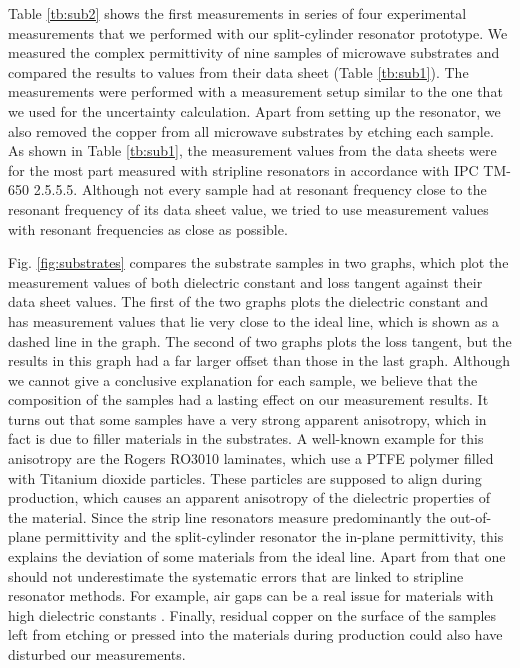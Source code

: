 Table \ref{tb:sub2} shows the first measurements in series of four experimental measurements that we performed with our split-cylinder resonator prototype. We measured the complex permittivity of nine samples of microwave substrates and compared the results to values from their data sheet (Table \ref{tb:sub1}). The measurements were performed with a measurement setup similar to the one that we used for the uncertainty calculation. Apart from setting up the resonator, we also removed the copper from all microwave substrates by etching each sample. As shown in Table \ref{tb:sub1}, the measurement values from the data sheets were for the most part measured with stripline resonators in accordance with IPC TM-650 2.5.5.5. Although not every sample had at resonant frequency close to the resonant frequency of its data sheet value, we tried to use measurement values with resonant frequencies as close as possible.

Fig. \ref{fig:substrates} compares the substrate samples in two graphs, which plot the measurement values of both dielectric constant and loss tangent against their data sheet values. The first of the two graphs plots the dielectric constant and has measurement values that lie very close to the ideal line, which is shown as a dashed line in the graph. The second of two graphs plots the loss tangent, but the results in this graph had a far larger offset than those in the last graph. Although we cannot give a conclusive explanation for each sample, we believe that the composition of the samples had a lasting effect on our measurement results. It turns out that some samples have a very strong apparent anisotropy, which in fact is due to filler materials in the substrates. A well-known example \cite{dankov, horn} for this anisotropy are the Rogers RO3010 laminates, which use a PTFE polymer filled with Titanium dioxide particles. These particles are supposed to align during production, which causes an apparent anisotropy of the dielectric properties of the material. Since the strip line resonators measure predominantly the out-of-plane permittivity and the split-cylinder resonator the in-plane permittivity, this explains the deviation of some materials from the ideal line. Apart from that one should not underestimate the systematic errors that are linked to stripline resonator methods. For example, air gaps can be a real issue for materials with high dielectric constants \cite{horn}. Finally,  residual copper on the surface of the samples left from etching or pressed into the materials during production could also have disturbed our measurements.
